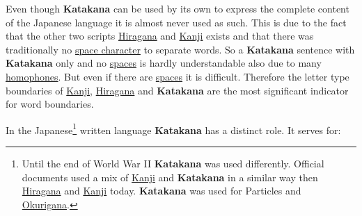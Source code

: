 Even though \textbf{Katakana} can be used by its own to express the complete
content of the Japanese language it is almost never used as such. This is due
to the fact that the other two scripts \hyperref[sec:Hiragana]{Hiragana} and
\hyperref[sec:Kanji]{Kanji} exists and that there was traditionally no
\hyperref[sec:SpaceCharacter]{space character} to separate words. So a
\textbf{Katakana} sentence with \textbf{Katakana} only and no
\hyperref[sec:SpaceCharacter]{spaces} is hardly understandable also due to many
\hyperref[sec:Homophone]{homophones}. But even if there are
\hyperref[sec:SpaceCharacter]{spaces} it is difficult. Therefore the letter
type boundaries of \hyperref[sec:Kanji]{Kanji},
\hyperref[sec:Hiragana]{Hiragana} and \textbf{Katakana} are the most
significant indicator for word boundaries.


\label{sec:role}

In the Japanese\footnote{Until the end of World War II \textbf{Katakana} was
used differently. Official documents used a mix of \hyperref[sec:Kanji]{Kanji}
and \textbf{Katakana} in a similar way then \hyperref[sec:Hiragana]{Hiragana}
and \hyperref[sec:Kanji]{Kanji} today. \textbf{Katakana} was used for
Particles and \hyperref[sec:Okurigana]{Okurigana}.} written language
\textbf{Katakana} has a distinct role. It serves for:

\bigskip


